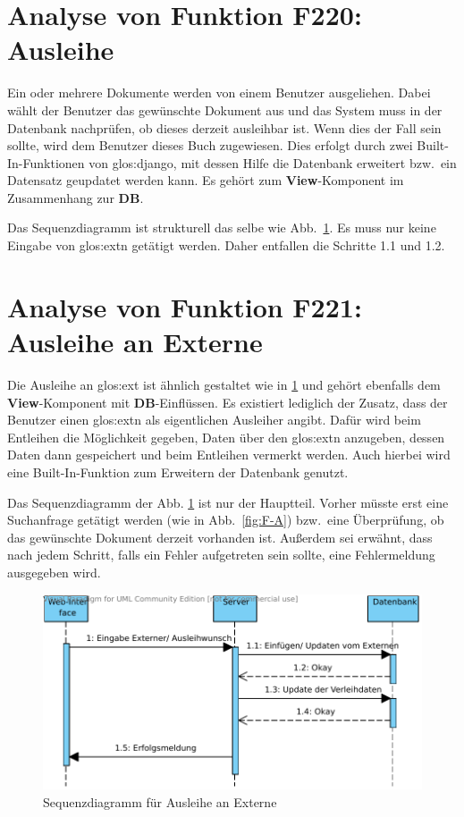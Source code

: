 \section{Analyse von Funktion F220: Ausleihe}
\label{f:220}
Ein oder mehrere Dokumente werden von einem Benutzer ausgeliehen. Dabei wählt 
der Benutzer das gewünschte Dokument aus und das System muss in der Datenbank 
nachprüfen, ob dieses derzeit ausleihbar ist. Wenn dies der Fall sein sollte, 
wird dem Benutzer dieses Buch zugewiesen. Dies erfolgt durch zwei 
Built-In-Funktionen von \gls{glos:django}, mit dessen Hilfe die Datenbank 
erweitert bzw.\ ein Datensatz geupdatet werden kann. Es gehört zum 
\textbf{View}-Komponent im Zusammenhang zur \textbf{DB}.

Das Sequenzdiagramm ist strukturell das selbe wie Abb.\ \ref{fig:221}. Es muss 
nur keine Eingabe von \gls{glos:ext}n getätigt werden. Daher entfallen die 
Schritte 1.1 und 1.2. 

\section{Analyse von Funktion F221: Ausleihe an Externe}
\label{f:221}
Die Ausleihe an \gls{glos:ext} ist ähnlich gestaltet wie in \ref{f:220} 
 und gehört ebenfalls dem \textbf{View}-Komponent mit 
\textbf{DB}-Einflüssen. Es existiert lediglich der Zusatz, dass der Benutzer 
einen \gls{glos:ext}n als eigentlichen Ausleiher angibt. Dafür wird beim 
Entleihen die Möglichkeit gegeben, Daten über den \gls{glos:ext}n anzugeben, 
dessen Daten dann gespeichert und beim Entleihen vermerkt werden. Auch hierbei 
wird eine Built-In-Funktion zum Erweitern der Datenbank genutzt.

Das Sequenzdiagramm der Abb. \ref{fig:221} ist nur der Hauptteil. Vorher müsste 
erst eine Suchanfrage getätigt werden (wie in Abb.\ \ref{fig:F-A}) bzw.\ eine 
Überprüfung, ob das gewünschte Dokument derzeit vorhanden ist. Außerdem sei 
erwähnt, dass nach jedem Schritt, falls ein Fehler aufgetreten sein sollte, eine 
Fehlermeldung ausgegeben wird.

\begin{figure}[h]
\begin{center}
\includegraphics[width=0.8\linewidth]{bilder/Seq-Ausleihe.pdf}
\caption{Sequenzdiagramm für Ausleihe an Externe}
\label{fig:221}
\end{center}
\end{figure}

